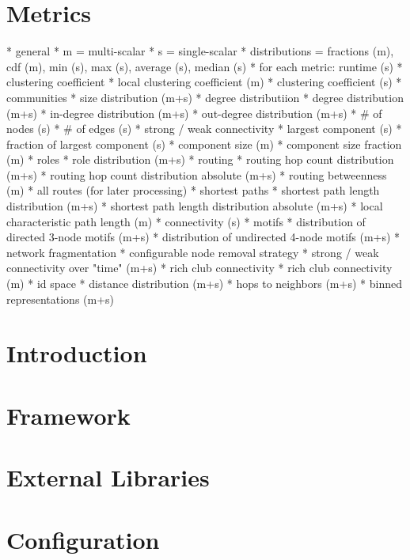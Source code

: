 \documentclass[11pt]{amsart}
\begin{document}
\section{Metrics}

* general
	* m = multi-scalar
	* s = single-scalar
	* distributions = fractions (m), cdf (m), min (s), max (s), average (s), median (s)
	* for each metric: runtime (s)
* clustering coefficient
	* local clustering coefficient (m)
	* clustering coefficient (s)
* communities
	* size distribution (m+s)
* degree distributiion
	* degree distribution (m+s)
	* in-degree distribution (m+s)
	* out-degree distribution (m+s)
	* \# of nodes (s)
	* \# of edges (s)
* strong / weak connectivity
	* largest component (s)
	* fraction of largest component (s)
	* component size (m)
	* component size fraction (m)
* roles
	* role distribution (m+s)
* routing
	* routing hop count distribution (m+s)
	* routing hop count distribution absolute (m+s)
	* routing betweenness (m)
	* all routes (for later processing)
* shortest paths
	* shortest path length distribution (m+s)
	* shortest path length distribution absolute (m+s)
	* local characteristic path length (m)
	* connectivity (s)
* motifs
	* distribution of directed 3-node motifs (m+s)
	* distribution of undirected 4-node motifs (m+s)
* network fragmentation
	* configurable node removal strategy
	* strong / weak connectivity over "time" (m+s)
* rich club connectivity
	* rich club connectivity (m)
* id space
	* distance distribution (m+s)
	* hops to neighbors (m+s)
	* binned representations (m+s)








\section{Introduction}

\section{Framework}

\section{External Libraries}

\section{Configuration}
\end{document}
